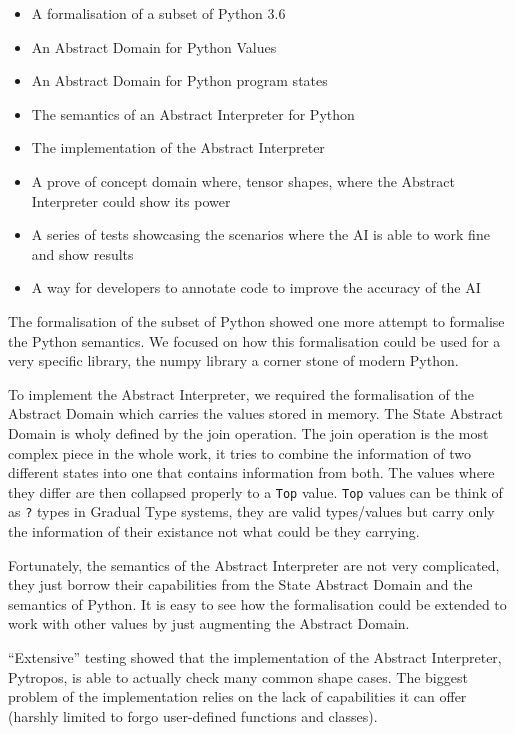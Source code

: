 \documentclass[
11pt, %
english, %
singlespacing, %
headsepline, %
]{MastersDoctoralThesis} %
\providecommand{\tightlist}{%
  \setlength{\itemsep}{0pt}\setlength{\parskip}{0pt}}
\begin{document}
\begin{itemize}
\tightlist
\item
  A formalisation of a subset of Python 3.6
\item
  An Abstract Domain for Python Values
\item
  An Abstract Domain for Python program states
\item
  The semantics of an Abstract Interpreter for Python
\item
  The implementation of the Abstract Interpreter
\item
  A prove of concept domain where, tensor shapes, where the Abstract
  Interpreter could show its power
\item
  A series of tests showcasing the scenarios where the AI is able to
  work fine and show results
\item
  A way for developers to annotate code to improve the accuracy of the
  AI
\end{itemize}

The formalisation of the subset of Python showed one more attempt to
formalise the Python semantics. We focused on how this formalisation
could be used for a very specific library, the numpy library a corner
stone of modern Python.

To implement the Abstract Interpreter, we required the formalisation of
the Abstract Domain which carries the values stored in memory. The State
Abstract Domain is wholy defined by the join operation. The join
operation is the most complex piece in the whole work, it tries to
combine the information of two different states into one that contains
information from both. The values where they differ are then collapsed
properly to a \texttt{Top} value. \texttt{Top} values can be think of as
\texttt{?} types in Gradual Type systems, they are valid types/values
but carry only the information of their existance not what could be they
carrying.

Fortunately, the semantics of the Abstract Interpreter are not very
complicated, they just borrow their capabilities from the State Abstract
Domain and the semantics of Python. It is easy to see how the
formalisation could be extended to work with other values by just
augmenting the Abstract Domain.

\enquote{Extensive} testing showed that the implementation of the
Abstract Interpreter, Pytropos, is able to actually check many common
shape cases. The biggest problem of the implementation relies on the
lack of capabilities it can offer (harshly limited to forgo user-defined
functions and classes).
\end{document}
